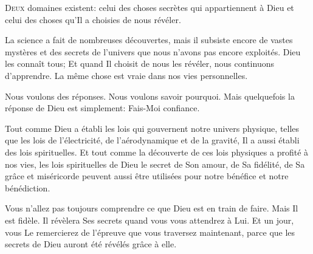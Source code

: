 \dvrule







\lettrine{D}{eux} domaines existent: celui des choses secrètes
 qui appartiennent à Dieu et celui des choses qu'Il a choisies de nous révéler.

La science a fait de nombreuses découvertes, mais il subsiste encore
 de vastes mystères et des secrets de l'univers que nous n'avons
 pas encore exploités.
 Dieu les connaît tous; Et quand Il choisit de nous les révéler,
 nous continuons d'apprendre.
 La même chose est vraie dans nos vies personnelles.


Nous voulons des réponses. Nous voulons savoir pourquoi.
 Mais quelquefois la réponse de Dieu est simplement:
 \Og Fais-Moi confiance. \Fg{}

Tout comme Dieu a établi les lois qui gouvernent notre univers physique,
 telles que les lois de l'électricité, de l'aérodynamique et de la gravité,
 Il a aussi établi des lois spirituelles.
 Et tout comme la découverte de ces lois physiques a profité à nos vies,
 les lois spirituelles de Dieu \ocadr le secret de Son amour, de Sa fidélité,
 de Sa grâce et miséricorde \fcadr{}
 peuvent aussi être utilisées pour notre bénéfice et notre bénédiction.

Vous n'allez pas toujours comprendre ce que Dieu est en train de faire.
 Mais Il est fidèle. Il révèlera Ses secrets quand vous vous attendrez à Lui.
 Et un jour, vous Le remercierez de l'épreuve que vous traversez maintenant,
 parce que les secrets de Dieu auront été révélés grâce à elle. 

